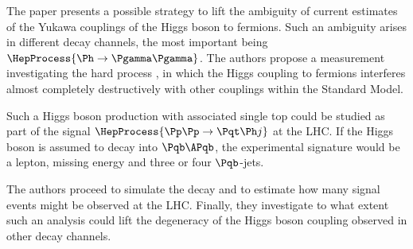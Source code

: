 

\usetikzlibrary{calc}
\usetikzlibrary{arrows,shapes}

\newcommand{\package}[1]{\texttt{#1}}
\newcommand{\class}[1]{\texttt{#1}}
\newcommand{\function}[1]{\texttt{#1}}
\newcommand{\fpath}[1]{\texttt{#1}}

\captionsetup{width=0.45\textwidth}

\newcommand{\eg}{e.g.\@ }

\usepackage{hyphenat}




The paper\cite{farina} presents a possible strategy to lift the ambiguity of current estimates of the Yukawa couplings of the Higgs boson to fermions.
Such an ambiguity arises in different decay channels, the most important being $\HepProcess{\Ph\to\Pgamma\Pgamma}$.
The authors propose a measurement investigating the hard process \HepProcess{\PW\Pqb\to\Pqt\Ph}, in which the Higgs coupling to fermions interferes almost completely destructively with other couplings within the Standard Model.

Such a Higgs boson production with associated single top could be studied as part of the signal $\HepProcess{\Pp\Pp\to\Pqt\Ph j}$ at the LHC.
If the Higgs boson is assumed to decay into $\Pqb\APqb$, the experimental signature would be a lepton, missing energy and three or four $\Pqb$-jets.

The authors proceed to simulate the decay and to estimate how many signal events might be observed at the LHC.
Finally, they investigate to what extent such an analysis could lift the degeneracy of the Higgs boson coupling observed in other decay channels.

